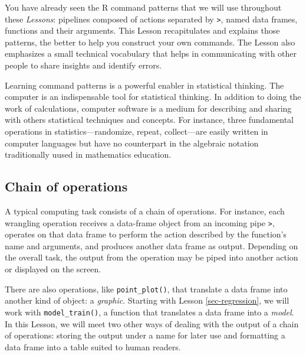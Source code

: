 \documentclass[
  letterpaper,
  DIV=11,
  numbers=noendperiod,
  oneside]{scrartcl}
\begin{document}
You have already seen the R command patterns that we will use throughout
these \emph{Lessons}: pipelines composed of actions separated by
\texttt{\textbar{}\textgreater{}}, named data frames, functions and
their arguments. This Lesson recapitulates and explains those patterns,
the better to help you construct your own commands. The Lesson also
emphasizes a small technical vocabulary that helps in communicating with
other people to share insights and identify errors.

Learning command patterns is a powerful enabler in statistical thinking.
The computer is an indispensable tool for statistical thinking.
{} In addition to doing the
work of calculations, computer software is a medium for describing and
sharing with others statistical techniques and concepts. For instance,
three fundamental operations in statistics---randomize, repeat,
collect---are easily written in computer languages but have no
counterpart in the algebraic notation traditionally uused in mathematics
education.

\subsection{Chain of operations}\label{chain-of-operations}

A typical computing task consists of a chain of operations. For
instance, each wrangling operation receives a data-frame object from an
incoming pipe \texttt{\textbar{}\textgreater{}}, operates on that data
frame to perform the action described by the function's name and
arguments, and produces another data frame as output. Depending on the
overall task, the output from the operation may be piped into another
action or displayed on the screen.

There are also operations, like \texttt{point\_plot()}, that translate a
data frame into another kind of object: a \emph{graphic}. Starting with
Lesson \ref{sec-regression}, we will work with \texttt{model\_train()},
a function that translates a data frame into a \emph{model}. In this
Lesson, we will meet two other ways of dealing with the output of a
chain of operations: storing the output under a name for later use and
formatting a data frame into a table suited to human readers.
\end{document}
